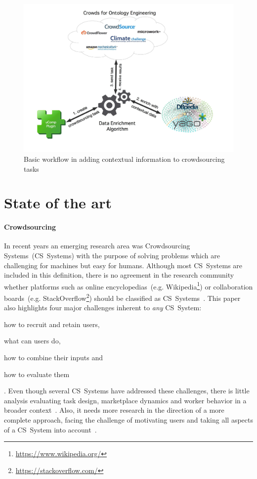 \documentclass[12pt, notitlepage]{article}
\begin{document}
\begin{figure}[H]
	 \includegraphics[width=\textwidth]{graphics/new_architecture}
	 \caption{Basic workflow in adding contextual information to crowdsourcing tasks}\label{fig:new_architecture}
\end{figure}

\section{State of the art}
\paragraph{Crowdsourcing}
In recent years an emerging research area was Crowdsourcing Systems~(CS~Systems) with the purpose of solving problems which are challenging for machines but easy for humans. Although most CS~Systems are included in this definition, there is no agreement in the research community whether platforms such as online encyclopedias~(e.g. Wikipedia\footnote{\url{https://www.wikipedia.org/}}) or collaboration boards~(e.g. StackOverflow\footnote{\url{https://stackoverflow.com/}}) should be classified as CS~Systems~\cite{crowdsourcingsystems2011}. 
This paper also highlights four major challenges inherent to \emph{any} CS~System: 
\begin{inparaenum}[1)]
		\item how to recruit and retain users, 
		\item what can users do, 
		\item how to combine their inputs and
		\item how to evaluate them
\end{inparaenum}.
Even though several CS~Systems have addressed these challenges, there is little analysis evaluating task design, marketplace dynamics and worker behavior in a broader context~\cite{jain2017understanding}. Also, it needs more research in the direction of a more complete approach, facing the challenge of motivating users and taking all aspects of a CS~System into account~\cite{truong2016incentive}. 
\end{document}
